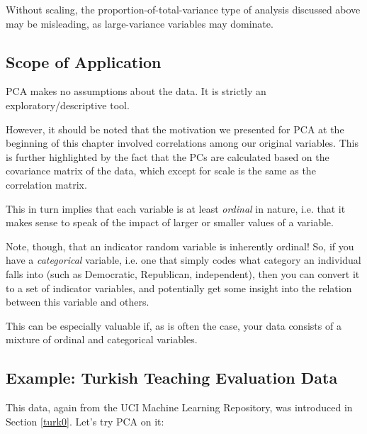 Without scaling, the proportion-of-total-variance type of analysis
discussed above may be misleading, as large-variance variables may
dominate.

\subsection{Scope of Application}

PCA makes no assumptions about the data.  It is strictly an
exploratory/descriptive tool.

However, it should be noted that the motivation we presented for PCA at
the beginning of this chapter involved correlations among our original
variables.  This is further highlighted by the fact that the PCs are
calculated based on the covariance matrix of the data, which except for
scale is the same as the correlation matrix.

This in turn implies that each variable is at least {\it ordinal} in
nature, i.e. that it makes sense to speak of the impact of larger or
smaller values of a variable.  

Note, though, that an indicator random variable is inherently ordinal!
So, if you have a {\it categorical} variable, i.e. one that simply codes
what category an individual falls into (such as Democratic, Republican,
independent), then you can convert it to a set of indicator variables,
and potentially get some insight into the relation between this variable
and others.  

This can be especially valuable if, as is often the case, your data
consists of a mixture of ordinal and categorical variables.

\subsection{Example:  Turkish Teaching Evaluation Data}

This data, again from the UCI Machine Learning Repository, was
introduced in Section \ref{turk0}.  Let's try PCA on it:

